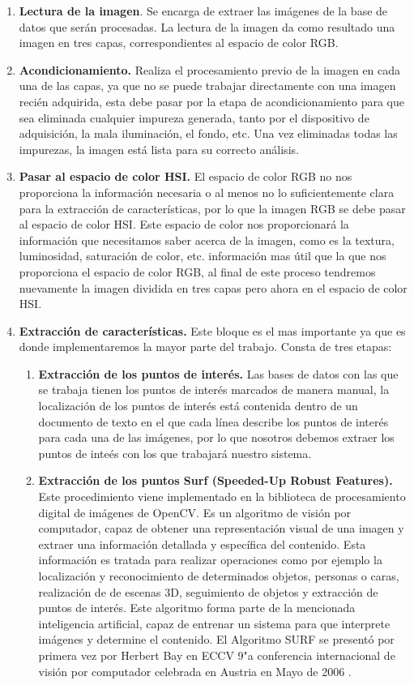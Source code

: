 \begin{enumerate}
	\item \textbf{Lectura de la imagen}. Se encarga de extraer las im\'agenes de la base de datos que ser\'an procesadas. La lectura de la imagen da como resultado una imagen en tres capas, correspondientes al espacio de color RGB.
	\item \textbf{Acondicionamiento.} Realiza el procesamiento previo de la imagen en cada una de las capas, ya que no se puede trabajar directamente con una imagen reci\'en adquirida, esta debe pasar por la etapa de acondicionamiento para que sea eliminada cualquier impureza generada, tanto por el dispositivo de adquisici\'on, la mala iluminaci\'on, el fondo, etc. Una vez eliminadas todas las impurezas, la imagen est\'a lista para su correcto an\'alisis.
	\item \textbf{Pasar al espacio de color HSI.} El espacio de color RGB no nos proporciona la informaci\'on necesaria o al menos no lo suficientemente clara para la extracci\'on de caracter\'isticas, por lo que la imagen RGB se debe pasar al espacio de color HSI. Este espacio de color nos proporcionar\'a la informaci\'on que necesitamos saber acerca de la imagen, como es la textura, luminosidad, saturaci\'on de color, etc. informaci\'on mas \'util que la que nos proporciona el espacio de color RGB, al final de este proceso tendremos nuevamente la imagen dividida en tres capas pero ahora en el espacio de color HSI.
	\item \textbf{Extracci\'on de caracter\'isticas.} Este bloque es el mas importante ya que es donde implementaremos la mayor parte del trabajo. Consta de tres etapas:
	\begin{enumerate}
		\item \textbf{Extracci\'on de los puntos de inter\'es.} Las bases de datos con las que se trabaja tienen los puntos de inter\'es marcados de manera manual, la localizaci\'on de los puntos de inter\'es est\'a contenida dentro de un documento de texto en el que cada l\'inea describe los puntos de inter\'es para cada una de las im\'agenes, por lo que nosotros debemos extraer los puntos de inte\'es con los que trabajar\'a nuestro sistema.
		\item \textbf{Extracci\'on de los puntos Surf (Speeded-Up Robust Features).} Este procedimiento viene implementado en la biblioteca de procesamiento digital de im\'agenes de OpenCV. Es un algoritmo de visi\'on por computador, capaz de obtener una representaci\'on visual de una imagen y extraer una informaci\'on detallada y espec\'ifica del contenido. Esta informaci\'on es tratada para realizar operaciones como por ejemplo la localizaci\'on y reconocimiento de determinados objetos, personas o caras, realizaci\'on de de escenas 3D, seguimiento de objetos y extracci\'on de puntos de inter\'es. Este algoritmo forma parte de la mencionada inteligencia artificial, capaz de entrenar un sistema para que interprete im\'agenes y determine el contenido. El Algoritmo SURF se present\'o por primera vez por Herbert Bay en ECCV 9"a conferencia internacional de visi\'on por computador celebrada en Austria en Mayo de 2006 \cite{bay2006surf}.

\end{enumerate}
\end{enumerate}
